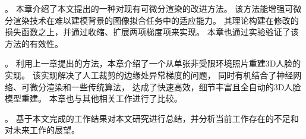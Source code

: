 
。
本章介绍了本文提出的一种对现有可微分渲染的改进方法。
该方法能增强可微分渲染技术在难以建模背景的图像拟合任务中的适应能力。
其理论构建在修改的损失函数之上，并通过收缩、扩展两项梯度项来实现。
本章也通过实验验证了该方法的有效性。

。
利用上一章提出的方法，本章介绍了一个从单张非受限环境照片重建3D人脸的实现。
该实现解决了人工裁剪的边缘处异常梯度的问题，
同时有机结合了神经网络、可微分渲染和一些传统算法，
达成了快速高效，细节丰富且全自动的3D人脸模型重建。
本章也与其他相关工作进行了比较。

。
基于本文完成的工作结果对本文研究进行总结，并分析当前工作存在的不足和对未来工作的展望。

